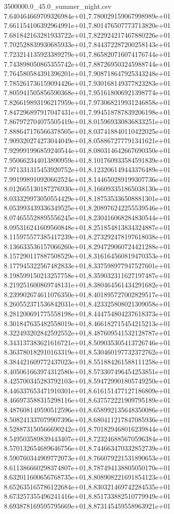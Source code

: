 \begin{filecontents*}{3500000.0_45.0_summer_night.csv}
7.640464669709326984e+01,7.780029159067998989e+01
7.661154106392964991e+01,7.801476507773713820e+01
7.681842163281933722e+01,7.822924217467880226e+01
7.702528839930685933e+01,7.844372287200258143e+01
7.723214135923389279e+01,7.865820716074176744e+01
7.743898050865355742e+01,7.887269503245988744e+01
7.764580584391396201e+01,7.908718647925343248e+01
7.785261736159094426e+01,7.930168149377823283e+01
7.805941505856590368e+01,7.951618006921398774e+01
7.826619893196217959e+01,7.973068219931246858e+01
7.847296897917047431e+01,7.994518787839206198e+01
7.867972704075505419e+01,8.015969330836833251e+01
7.888647176566378505e+01,8.037418840110422025e+01
7.909320274273044049e+01,8.058867277791341621e+01
7.929991996859240544e+01,8.080314642667690350e+01
7.950662344013890959e+01,8.101760933584591839e+01
7.971331315453920752e+01,8.123206149443376489e+01
7.991998910920662524e+01,8.144650289199307736e+01
8.012665130187276930e+01,8.166093351865038130e+01
8.033329973050554429e+01,8.187535336508881301e+01
8.053993439336349525e+01,8.208976242255539546e+01
8.074655528895556245e+01,8.230416068284830544e+01
8.095316241609560848e+01,8.251854813834324887e+01
8.115975577385417239e+01,8.273292478197618038e+01
8.136633536157066260e+01,8.294729060724421288e+01
8.157290117887508529e+01,8.316164560819470353e+01
8.177945322567482833e+01,8.337598977947527601e+01
8.198599150213257758e+01,8.359032311627197487e+01
8.219251600869748131e+01,8.380464561434291682e+01
8.239902674611076350e+01,8.401895727002829517e+01
8.260552371536842031e+01,8.423325808021309058e+01
8.281200691775558198e+01,8.444754804237618373e+01
8.301847635482558019e+01,8.466182715454215213e+01
8.322493202842592552e+01,8.487609541532128787e+01
8.343137383621616721e+01,8.509035305413726746e+01
8.363780182910163319e+01,8.530460197732372762e+01
8.384421609772437023e+01,8.551884261588111258e+01
8.405061663974312580e+01,8.573307496454253851e+01
8.425700345283792103e+01,8.594729901805749250e+01
8.446337653471910301e+01,8.616151477127186809e+01
8.466973588315298116e+01,8.637572221909795189e+01
8.487608149590512596e+01,8.658992135648350086e+01
8.508241337079907396e+01,8.680411217847085936e+01
8.528873150566690242e+01,8.701829468016239844e+01
8.549503589839443407e+01,8.723246885670596384e+01
8.570132654689646756e+01,8.744663470332852739e+01
8.590760344909772073e+01,8.766079221531890653e+01
8.611386660298374807e+01,8.787494138805050170e+01
8.632011600656768735e+01,8.808908221691854123e+01
8.652635165786122684e+01,8.830321469742284535e+01
8.673257355496241416e+01,8.851733882510779949e+01
8.693878169595795669e+01,8.873145459558963921e+01

\end{filecontents*}
